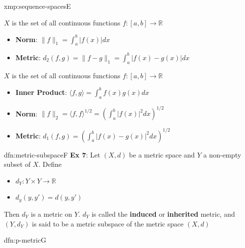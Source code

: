 \documentclass[landscape, 8pt]{extarticle}
\begin{document}
\begin{multicols}{3}
\begin{xmp}{xmp:sequence-spaces}{E}
    \vspace{-3pt}

    $X$ is the set of all continuous functions $f : [a, b] \to \mathbb{R}$
    \vspace{-3pt}
    \begin{itemize}
        \item \textbf{Norm}: $\lVert f \rVert_{1} = \int_{a}^{b} \lvert f(x) \rvert dx$
        \item \textbf{Metric}: $d_{2}(f, g) = \lVert f - g \rVert_{1} = \int_{a}^{b} \lvert f(x) - g(x) \rvert dx$
    \end{itemize}
    \vspace{-3pt}


    $X$ is the set of all continuous functions $f : [a, b] \to \mathbb{R}$
    \vspace{-3pt}
    \begin{itemize}
        \item \textbf{Inner Product}: $\langle f, g \rangle = \int_{a}^{b} f(x)g(x) dx$
        \item \textbf{Norm}: $\lVert f \rVert_{2} = \langle f, f \rangle^{1 /2} = \left(\int_{a}^{b} \lvert f(x) \rvert^{2} dx\right)^{1 /2}$
        \item \textbf{Metric}: $d_{1}(f, g) = \left(\int_{a}^{b} \lvert f(x) - g(x) \rvert^{2} dx\right)^{1 /2}$
    \end{itemize}
\end{xmp}

\begin{dfn}{dfn:metric-subspace}{F}
    \textbf{Ex 7}: Let $(X, d)$ be a metric space and $Y$ a non-empty subset of $X$. Define
    \begin{itemize}
        \item $d_{Y} : Y \times Y \to \mathbb{R}$
        \item $d_{y}(y, y') = d(y, y')$
    \end{itemize}

    Then $d_{Y}$ is a metric on $Y$. $d_{Y}$ is called the \textbf{induced} or \textbf{inherited} metric, and $(Y, d_{Y})$ is said to be a metric subspace of the metric space $(X, d)$
\end{dfn}

\newpage

\begin{thm}{dfn:p-metric}{G}


\end{thm}
\end{multicols}
\end{document}

